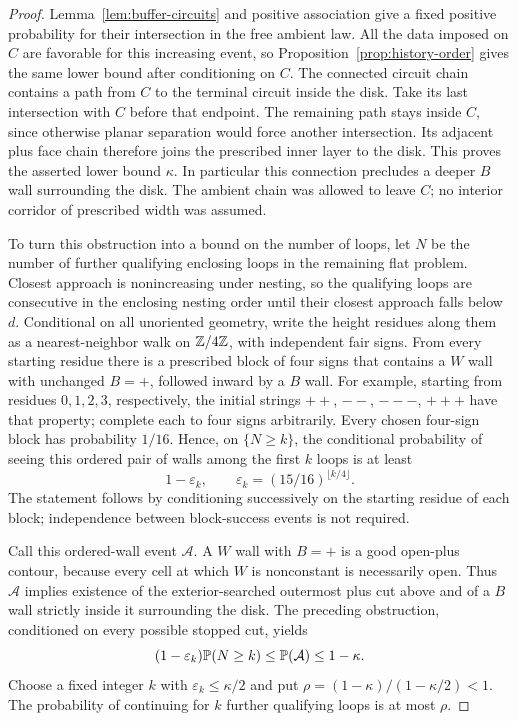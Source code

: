 \begin{proof}
Lemma~\ref{lem:buffer-circuits} and positive association give a fixed
positive probability for their intersection in the free ambient law.
All the data imposed on $C$ are favorable for this increasing event,
so Proposition~\ref{prop:history-order} gives the same lower bound after
conditioning on $C$.  The connected circuit chain contains a path
from $C$ to the terminal circuit inside the disk.  Take its last
intersection with $C$ before that endpoint.  The remaining path stays
inside $C$, since otherwise planar separation would force another
intersection.  Its adjacent plus face chain therefore joins the
prescribed inner layer to the disk.  This proves the asserted lower
bound $\kappa$.  In particular this connection precludes a deeper
$B$ wall surrounding the disk.  The ambient chain was allowed to leave
$C$; no interior corridor of prescribed width was assumed.

To turn this obstruction into a bound on the number of loops, let $N$
be the number of further qualifying enclosing loops in the remaining
flat problem.  Closest approach is nonincreasing under nesting, so the
qualifying loops are consecutive in the enclosing nesting order until
their closest approach falls below $d$.  Conditional on all unoriented
geometry, write the height residues along them as a nearest-neighbor
walk on $\mathbb Z/4\mathbb Z$, with independent fair signs.  From every starting
residue there is a prescribed block of four signs that contains a
$W$ wall with unchanged $B=+$, followed inward by a $B$ wall.  For
example, starting from residues $0,1,2,3$, respectively, the initial
strings $++$, $--$, $---$, $+++$ have that property; complete each to
four signs arbitrarily.  Every chosen four-sign block has probability
$1/16$.  Hence, on $\{N\geq k\}$, the conditional probability of
seeing this ordered pair of walls among the first $k$ loops is at least
\[
 1-\varepsilon_k,
 \qquad \varepsilon_k=(15/16)^{\lfloor k/4\rfloor}.
\]
The statement follows by conditioning successively on the starting
residue of each block; independence between block-success events is
not required.

Call this ordered-wall event $\mathcal A$.  A $W$ wall with $B=+$ is
a good open-plus contour, because every cell at which $W$ is
nonconstant is necessarily open.  Thus $\mathcal A$ implies existence
of the exterior-searched outermost plus cut above and of a $B$ wall
strictly inside it surrounding the disk.  The preceding obstruction,
conditioned on every possible stopped cut, yields
\[
 (1-\varepsilon_k)\mathbb P(N\geq k)
 \leq\mathbb P(\mathcal A)\leq1-\kappa.
\]
Choose a fixed integer $k$ with $\varepsilon_k\leq\kappa/2$ and put
$\rho=(1-\kappa)/(1-\kappa/2)<1$.  The probability of continuing for
$k$ further qualifying loops is at most $\rho$.


\end{proof}
